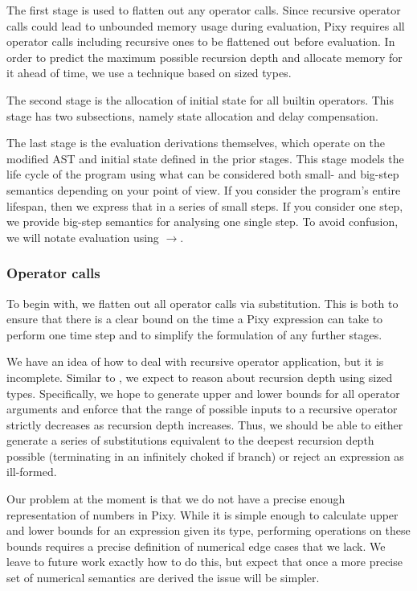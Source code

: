 \documentclass{scrartcl}
\begin{document}
    The first stage is used to flatten out any operator calls. Since recursive operator calls could lead to unbounded memory usage during evaluation, Pixy requires all operator calls including recursive ones to be flattened out before evaluation. In order to predict the maximum possible recursion depth and allocate memory for it ahead of time, we use a technique based on sized types.
    
    The second stage is the allocation of initial state for all builtin operators. This stage has two subsections, namely state allocation and delay compensation.
    
    The last stage is the evaluation derivations themselves, which operate on the modified AST and initial state defined in the prior stages. This stage models the life cycle of the program using what can be considered both small- and big-step semantics depending on your point of view. If you consider the program's entire lifespan, then we express that in a series of small steps. If you consider one step, we provide big-step semantics for analysing one single step. To avoid confusion, we will notate evaluation using $\rightarrow$.
    
    \subsubsection{Operator calls}
    
    To begin with, we flatten out all operator calls via substitution. This is both to ensure that there is a clear bound on the time a Pixy expression can take to perform one time step and to simplify the formulation of any further stages.
    
    We have an idea of how to deal with recursive operator application, but it is incomplete. Similar to \cite{abel}, we expect to reason about recursion depth using sized types. Specifically, we hope to generate upper and lower bounds for all operator arguments and enforce that the range of possible inputs to a recursive operator strictly decreases as recursion depth increases. Thus, we should be able to either generate a series of substitutions equivalent to the deepest recursion depth possible (terminating in an infinitely choked if branch) or reject an expression as ill-formed.
    
    Our problem at the moment is that we do not have a precise enough representation of numbers in Pixy. While it is simple enough to calculate upper and lower bounds for an expression given its type, performing operations on these bounds requires a precise definition of numerical edge cases that we lack. We leave to future work exactly how to do this, but expect that once a more precise set of numerical semantics are derived the issue will be simpler.
    
\end{document}
